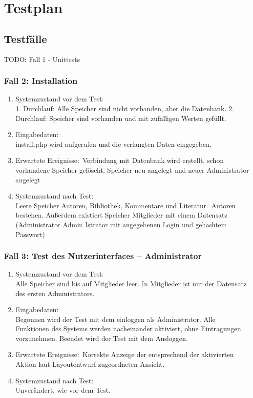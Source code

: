 \section{Testplan}
\subsection{Testfälle}

TODO: Fall 1 - Unittests

\subsubsection{Fall 2: Installation}
\begin{enumerate}
\item Systemzustand vor dem Test:\\
	1. Durchlauf: Alle Speicher sind nicht vorhanden, aber die Datenbank. 2. Durchlauf: Speicher sind vorhanden und mit zufälligen Werten gefüllt.
\item Eingabedaten:\\
	install.php wird aufgerufen und die verlangten Daten eingegeben.
\item Erwartete Ereignisse:\
	Verbindung mit Datenbank wird erstellt, schon vorhandene Speicher gelöscht, Speicher neu angelegt und neuer Administrator angelegt
\item Systemzustand nach Test:\\
	Leere Speicher Autoren, Bibliothek, Kommentare und Literatur\_Autoren bestehen. Außerdem existiert Speicher Mitglieder mit einem Datensatz (Administrator Admin Istrator mit angegebenen Login und gehashtem Passwort)
\end{enumerate}

\subsubsection{Fall 3: Test des Nutzerinterfaces -- Administrator}
\begin{enumerate}
\item Systemzustand vor dem Test:\\
	Alle Speicher sind bis auf Mitglieder leer. In Mitglieder ist nur der Datensatz des ersten Administrators.
\item Eingabedaten:\\
	Begonnen wird der Test mit dem einloggen als Administrator. Alle Funktionen des Systems werden nacheinander aktiviert, ohne Eintragungen vorzunehmen. Beendet wird der Test mit dem Ausloggen.
\item Erwartete Ereignisse:\
	Korrekte Anzeige der entsprechend der aktivierten Aktion laut Layoutentwurf zugeordneten Ansicht.
\item Systemzustand nach Test:\\
	Unverändert, wie vor dem Test.
\end{enumerate}

